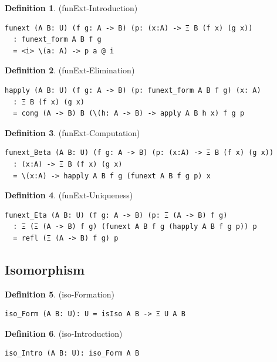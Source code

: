 \documentclass{article}
\theoremstyle{definition}
\newtheorem{definition}{Definition}
\begin{document}
\begin{definition} (funExt-Introduction)
\begin{lstlisting}
funext (A B: U) (f g: A -> B) (p: (x:A) -> Ξ B (f x) (g x))
  : funext_form A B f g
  = <i> \(a: A) -> p a @ i
\end{lstlisting}
\end{definition}

\begin{definition} (funExt-Elimination)
\begin{lstlisting}
happly (A B: U) (f g: A -> B) (p: funext_form A B f g) (x: A)
  : Ξ B (f x) (g x)
  = cong (A -> B) B (\(h: A -> B) -> apply A B h x) f g p
\end{lstlisting}
\end{definition}

\begin{definition} (funExt-Computation)
\begin{lstlisting}
funext_Beta (A B: U) (f g: A -> B) (p: (x:A) -> Ξ B (f x) (g x))
  : (x:A) -> Ξ B (f x) (g x)
  = \(x:A) -> happly A B f g (funext A B f g p) x
\end{lstlisting}
\end{definition}

\begin{definition} (funExt-Uniqueness)
\begin{lstlisting}
funext_Eta (A B: U) (f g: A -> B) (p: Ξ (A -> B) f g)
  : Ξ (Ξ (A -> B) f g) (funext A B f g (happly A B f g p)) p
  = refl (Ξ (A -> B) f g) p
\end{lstlisting}
\end{definition}

\newpage
\subsection{Isomorphism}

\begin{definition} (iso-Formation)
\begin{lstlisting}
iso_Form (A B: U): U = isIso A B -> Ξ U A B
\end{lstlisting}
\end{definition}

\begin{definition} (iso-Introduction)
\begin{lstlisting}
iso_Intro (A B: U): iso_Form A B
\end{lstlisting}
\end{definition}
\end{document}
